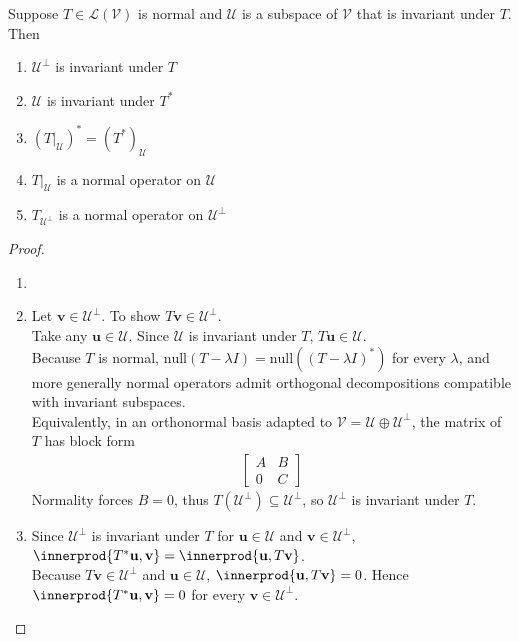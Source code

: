 \begin{proposition} \label{prop:normalinvarianceequivalence} Suppose $T \in \mathcal{L}(\mathcal{V})$ is normal and $\mathcal{U}$ is a subspace of $\mathcal{V}$ that is invariant under $T$. Then
\begin{enumerate}[label=\roman*.]
\setlength{\itemsep}{0pt}
\item $\mathcal{U}^{\perp}$ is invariant under $T$
\item $\mathcal{U}$ is invariant under $T^*$
\item $(T|_{\mathcal{U}})^* = (T^*)_{\mathcal{U}}$
\item $T|_{\mathcal{U}}$ is a normal operator on $\mathcal{U}$
\item $T_{\mathcal{U}^{\perp}}$ is a normal operator on $\mathcal{U}^{\perp}$
\end{enumerate}
\begin{proof}
\begin{enumerate}[label=\roman*.]
\setlength{\itemsep}{0pt}
\item[]
\item[$(i)$] Let $\mathbf{v} \in \mathcal{U}^{\perp}$. To show $T \mathbf{v} \in \mathcal{U}^{\perp}$.\\
Take any $\mathbf{u} \in \mathcal{U}$. Since $\mathcal{U}$ is invariant under $T$, $T \mathbf{u} \in \mathcal{U}$.\\
Because $T$ is normal, $\text{null}(T - \lambda I) = \text{null}((T - \lambda I)^*)$ for every $\lambda$, and more generally normal operators admit orthogonal decompositions compatible with invariant subspaces.\\
Equivalently, in an orthonormal basis adapted to $\mathcal{V} = \mathcal{U} \oplus \mathcal{U}^{\perp}$, the matrix of $T$ has block form
\begin{align}
\begin{bmatrix}
A & B \\
0 & C
\end{bmatrix} \nonumber
\end{align}
Normality forces $B = 0$, thus $T(\mathcal{U}^{\perp}) \subseteq \mathcal{U}^{\perp}$, so $\mathcal{U}^{\perp}$ is invariant under $T$.
\item[$(ii)$] Since $\mathcal{U}^{\perp}$ is invariant under $T$ for $\mathbf{u} \in \mathcal{U}$ and $\mathbf{v} \in \mathcal{U}^{\perp}$, $\innerprod{T^* \mathbf{u}, \mathbf{v}} = \innerprod{\mathbf{u}, T \mathbf{v}}$.\\
Because $T \mathbf{v} \in \mathcal{U}^{\perp}$ and $\mathbf{u} \in \mathcal{U}$, $\innerprod{\mathbf{u}, T \mathbf{v}} = 0$. Hence $\innerprod{T^* \mathbf{u}, \mathbf{v}} = 0$ for every $\mathbf{v} \in \mathcal{U}^{\perp}$.\\

\end{enumerate}
\end{proof}
\end{proposition}
